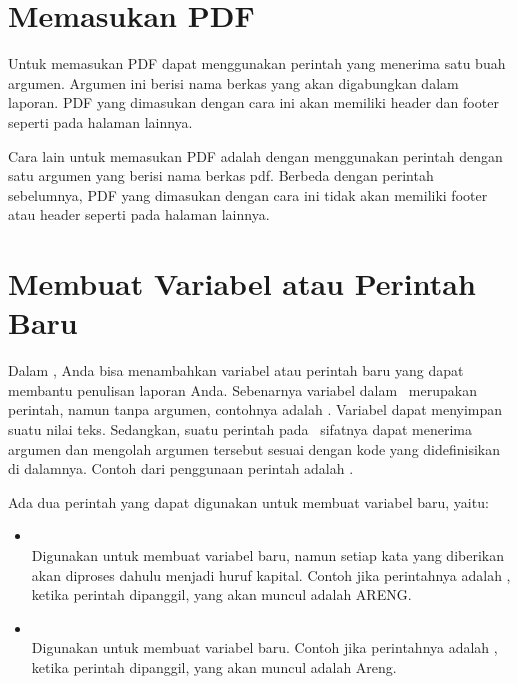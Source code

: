 \section{Memasukan PDF}
\label{sec:pdf}
Untuk memasukan PDF dapat menggunakan perintah  yang menerima satu buah argumen.
Argumen ini berisi nama berkas yang akan digabungkan dalam laporan.
PDF yang dimasukan dengan cara ini akan memiliki header dan footer seperti pada halaman lainnya.


Cara lain untuk memasukan PDF adalah dengan menggunakan perintah  dengan satu argumen yang berisi nama berkas pdf.
Berbeda dengan perintah sebelumnya, PDF yang dimasukan dengan cara ini tidak akan memiliki footer atau header seperti pada halaman lainnya.



\section{Membuat Variabel atau Perintah Baru}
\label{sec:newCommand}
Dalam \latex, Anda bisa menambahkan variabel atau perintah baru yang dapat membantu penulisan laporan Anda.
Sebenarnya variabel dalam \latex~merupakan perintah, namun tanpa argumen, contohnya adalah .
Variabel dapat menyimpan suatu nilai teks.
Sedangkan, suatu perintah pada \latex~sifatnya dapat menerima argumen dan mengolah argumen tersebut sesuai dengan kode yang didefinisikan di dalamnya.
Contoh dari penggunaan perintah adalah .

Ada dua perintah yang dapat digunakan untuk membuat variabel baru, yaitu:
\begin{itemize}
	\item {} \\
	Digunakan untuk membuat variabel baru, namun setiap kata yang diberikan akan diproses dahulu menjadi huruf kapital.
	Contoh jika perintahnya adalah , ketika perintah  dipanggil, yang akan muncul adalah ARENG.
	\item {} \\
	Digunakan untuk membuat variabel baru.
	Contoh jika perintahnya adalah , ketika perintah  dipanggil, yang akan muncul adalah Areng.
\end{itemize}

